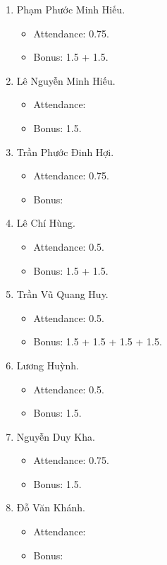 \documentclass{article}
\begin{document}
\begin{enumerate}
\begin{itemize}
    \end{itemize}
    \item {\sc Phạm Phước Minh Hiếu.}
    \begin{itemize}
        \item Attendance: 0.75.
        \item Bonus: 1.5 + 1.5.
    \end{itemize}
    \item {\sc Lê Nguyễn Minh Hiếu.}
    \begin{itemize}
        \item Attendance:
        \item Bonus: 1.5.
    \end{itemize}
    \item {\sc Trần Phước Đinh Hợi.}
    \begin{itemize}
        \item Attendance: 0.75.
        \item Bonus:
    \end{itemize}
    \item {\sc Lê Chí Hùng.}
    \begin{itemize}
        \item Attendance: 0.5.
        \item Bonus: 1.5 + 1.5.
    \end{itemize}
    \item {\sc Trần Vũ Quang Huy.}
    \begin{itemize}
        \item Attendance: 0.5.
        \item Bonus: 1.5 + 1.5 + 1.5 + 1.5.
    \end{itemize}
    \item {\sc Lương Huỳnh.}
    \begin{itemize}
        \item Attendance: 0.5.
        \item Bonus: 1.5.
    \end{itemize}
    \item {\sc Nguyễn Duy Kha.}
    \begin{itemize}
        \item Attendance: 0.75.
        \item Bonus: 1.5.
    \end{itemize}
    \item {\sc Đỗ Văn Khánh.}
    \begin{itemize}
        \item Attendance:
        \item Bonus:

\end{itemize}
\end{enumerate}
\end{document}
